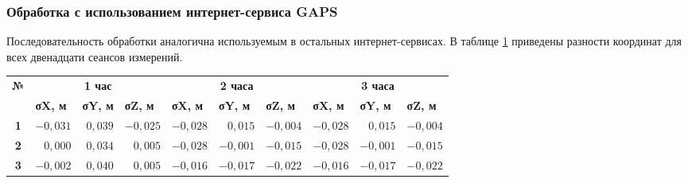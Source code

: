 \subsubsection{Обработка с использованием интернет-сервиса GAPS }\label{subsec:ch2/sec3/sub1/sub3}

Последовательность обработки аналогична используемым в остальных интернет-сервисах. В таблице \cref{tab:tab11} приведены разности координат для всех двенадцати сеансов измерений.


\begin{table} [htbp]
	\centering\small
	\label{tab:tab11}{%
		\begin{tabular}{|c|rrr|rrr|rrr|}
			\hline
			\multirow{2}{*}{\textbf{№}} & 
			\multicolumn{3}{c|}{\textbf{1 час}}                                                                             & \multicolumn{3}{c|}{\textbf{2 часа}}                                                                            & \multicolumn{3}{c|}{\textbf{3 часа}}                                                                            \\ \cline{2-10} 
			& \multicolumn{1}{l|}{\textbf{σX, м}} & \multicolumn{1}{l|}{\textbf{σY, м}} & \multicolumn{1}{l|}{\textbf{σZ, м}} & \multicolumn{1}{l|}{\textbf{σX, м}} & \multicolumn{1}{l|}{\textbf{σY, м}} & \multicolumn{1}{l|}{\textbf{σZ, м}} & \multicolumn{1}{l|}{\textbf{σX, м}} & \multicolumn{1}{l|}{\textbf{σY, м}} & \multicolumn{1}{l|}{\textbf{σZ, м}} \\ \hline
					\textbf{1}                  & 
			\multicolumn{1}{r|}{$-0,031$}       & \multicolumn{1}{r|}{$ 0,039$}       & $-0,025$                            & \multicolumn{1}{r|}{$-0,028$}       & \multicolumn{1}{r|}{$ 0,015$}       & $-0,004$                            & \multicolumn{1}{r|}{$-0,028$}       & \multicolumn{1}{r|}{$ 0,015$}       & $-0,004$                            \\ \hline
			\textbf{2}               		   & 
			\multicolumn{1}{r|}{$ 0,000$}       & \multicolumn{1}{r|}{$ 0,034$}       & $ 0,005$                            & \multicolumn{1}{r|}{$-0,028$}       & \multicolumn{1}{r|}{$-0,001$}       & $-0,015$                            & \multicolumn{1}{r|}{$-0,028$}       & \multicolumn{1}{r|}{$-0,001$}       & $-0,015$                            \\ \hline
			\textbf{3}                			& 
			\multicolumn{1}{r|}{$-0,002$}       & \multicolumn{1}{r|}{$ 0,040$}       & $ 0,005$                            & \multicolumn{1}{r|}{$-0,016$}       & \multicolumn{1}{r|}{$-0,017$}       & $-0,022$                            & \multicolumn{1}{r|}{$-0,016$}       & \multicolumn{1}{r|}{$-0,017$}       & $-0,022$                            \\ \hline

\end{tabular}}
\end{table}
